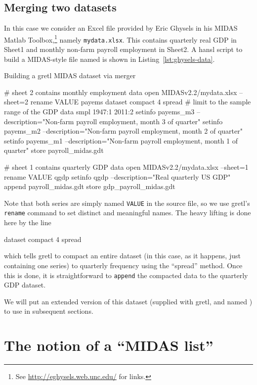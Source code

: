 \subsection{Merging two datasets}
\label{sec:data-merge}

In this case we consider an Excel file provided by Eric Ghysels in his
\textsf{MIDAS Matlab Toolbox},\footnote{See
  \url{http://eghysels.web.unc.edu/} for links.} namely
\texttt{mydata.xlsx}.  This contains quarterly real GDP in Sheet1 and
monthly non-farm payroll employment in Sheet2. A hansl script to build
a MIDAS-style file named  is shown in
Listing~\ref{lst:ghysels-data}.

\begin{script}[htbp]
  \caption{Building a gretl MIDAS dataset via merger}
  \label{lst:ghysels-data}
\begin{scode}
# sheet 2 contains monthly employment data
open MIDASv2.2/mydata.xlsx --sheet=2
rename VALUE payems
dataset compact 4 spread
# limit to the sample range of the GDP data
smpl 1947:1 2011:2
setinfo payems_m3 --description="Non-farm payroll employment, month 3 of quarter"
setinfo payems_m2 --description="Non-farm payroll employment, month 2 of quarter"
setinfo payems_m1 --description="Non-farm payroll employment, month 1 of quarter"
store payroll_midas.gdt

# sheet 1 contains quarterly GDP data
open MIDASv2.2/mydata.xlsx --sheet=1
rename VALUE qgdp
setinfo qgdp --description="Real quarterly US GDP"
append payroll_midas.gdt
store gdp_payroll_midas.gdt
\end{scode}
\end{script}

Note that both series are simply named \texttt{VALUE} in the source
file, so we use gretl's \texttt{rename} command to set distinct and
meaningful names. The heavy lifting is done here by the line
%
\begin{code}
dataset compact 4 spread
\end{code}
%
which tells gretl to compact an entire dataset (in this case, as it
happens, just containing one series) to quarterly frequency using the
``spread'' method. Once this is done, it is straightforward to
\texttt{append} the compacted data to the quarterly GDP dataset.

We will put an extended version of this dataset (supplied with gretl,
and named ) to use in subsequent sections.

\section{The notion of a ``MIDAS list''}
\label{sec:midas-list}

